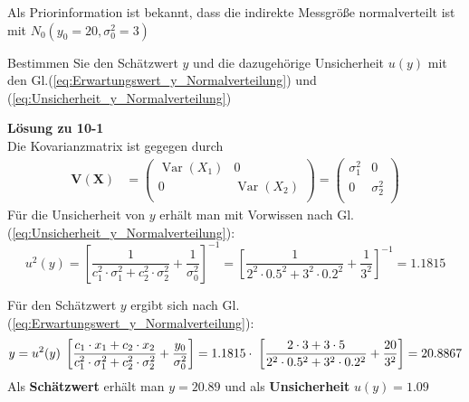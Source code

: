 Als Priorinformation ist bekannt, dass die indirekte Messgröße
normalverteilt ist mit \newline  $N_0(y_0=20,\sigma_0^2=3)$

Bestimmen Sie den Schätzwert $y$ und die dazugehörige Unsicherheit 
$u(y)$ mit den Gl.(\ref{eq:Erwartungswert_y_Normalverteilung}) und 
(\ref{eq:Unsicherheit_y_Normalverteilung})

\textbf{Lösung zu 10-1} \\
Die Kovarianzmatrix ist gegegen durch 
\begin{align}
\boldsymbol{V(X)} &= 
\begin{pmatrix}
\operatorname{Var}(X_1) & 0 \\
0 & \operatorname{Var}(X_2)  \\
\end{pmatrix}
= 
\begin{pmatrix}
\sigma_1^2 & 0 \\
0 & \sigma_2^2 \\
\end{pmatrix}
\end{align}
Für die Unsicherheit von $y$ erhält man mit Vorwissen nach Gl.	(\ref{eq:Unsicherheit_y_Normalverteilung}):
\[
u^2(y) = \left[ \frac{1}{c_1^2\cdot \sigma_1^2 + c_2^2\cdot \sigma_2^2} 
+ \frac{1}{\sigma_0^2} \right]^{-1}
 = \left[ \frac{1}{2^2\cdot 0.5^2 + 3^2\cdot 0.2^2} 
+ \frac{1}{3^2} \right]^{-1} = 1.1815
\]

Für den Schätzwert $y$ ergibt sich nach Gl.(\ref{eq:Erwartungswert_y_Normalverteilung}):
\[
y = u^2(y) \;\left[ \frac{\textstyle c_1\cdot x_1 + c_2\cdot x_2}
{\textstyle c_1^2 \cdot \sigma_1^2 + c_2^2\cdot \sigma_2^2} +\frac{y_0}{\sigma_0^2} \right]
 = 1.1815 \cdot \; \left[\frac{2\cdot 3 + 3\cdot 5}
{2^2 \cdot 0.5^2 + 3^2\cdot 0.2^2} + \frac{20}{3^2} \right] = 20.8867
\]
Als \textbf{Schätzwert} erhält man $y=20.89$ und als \textbf{Unsicherheit} $u(y)= 1.09 $


\begin{thebibliography}{------}
	\item[] \hspace*{5em}{\Large\bf zu Kapitel 10:}
\end{thebibliography}